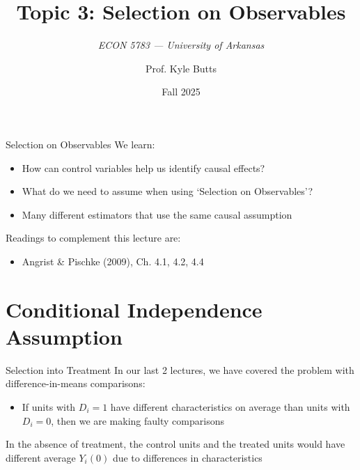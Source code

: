 \documentclass[aspectratio=169,t,11pt,table]{beamer}
\title{Topic 3: Selection on Observables}
\subtitle{\it  ECON 5783 — University of Arkansas}
\date{Fall 2025}
\author{Prof. Kyle Butts}
\begin{document}
\begin{frame}
\maketitle

\end{frame}

\begin{frame}{Selection on Observables}
  We learn:
  \begin{itemize}
    \item How can control variables help us identify causal effects?
    \item What do we need to assume when using `Selection on Observables'?
    \item Many different estimators that use the same causal assumption
  \end{itemize}

  \bigskip
  Readings to complement this lecture are:
  \begin{itemize}
    \item Angrist \& Pischke (2009), Ch. 4.1, 4.2, 4.4
  \end{itemize}
\end{frame}

\section{Conditional Independence Assumption}

\begin{frame}{Selection into Treatment}
  In our last 2 lectures, we have covered the problem with difference-in-means comparisons:
  \begin{itemize}
    \item If units with $D_i = 1$ have different characteristics on average than units with $D_i = 0$, then we are making faulty comparisons
  \end{itemize}

  \pause
  \bigskip
  In the absence of treatment, the control units and the treated units would have different average $Y_i(0)$ due to differences in characteristics
\end{frame}
\end{document}
